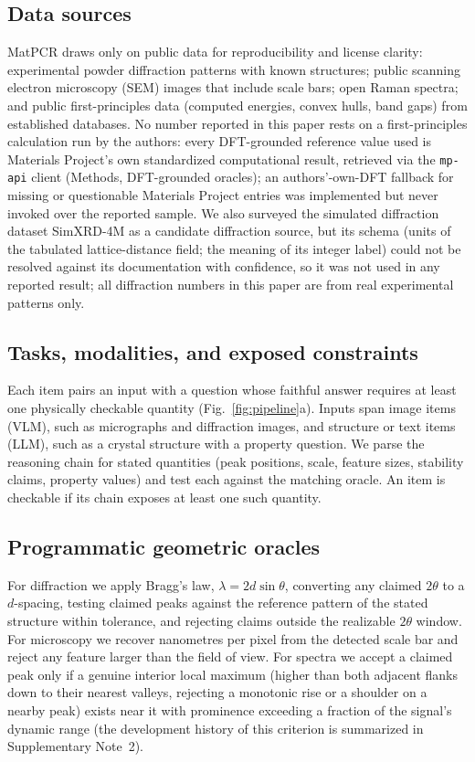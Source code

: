 \documentclass[pdflatex,sn-nature]{sn-jnl}
\newcommand{\rev}[1]{#1}
\newcommand{\rev}[1]{{\color{blue}#1}}
\begin{document}
\subsection*{Data sources}
MatPCR draws only on public data for reproducibility and license clarity: experimental
powder diffraction patterns with known structures;\cite{opxrd2025} public scanning electron microscopy (SEM) images that include scale bars;\cite{aversa2018nffa} open Raman spectra;\cite{lafuente2015rruff} and public first-principles data (computed energies, convex hulls, band gaps) from established databases.\cite{matproj2013} No number reported in this paper rests on a first-principles calculation run by the authors: every DFT-grounded reference value used is Materials Project's own standardized computational result, retrieved via the \texttt{mp-api} client (Methods, DFT-grounded oracles); an authors'-own-DFT fallback for missing or questionable Materials Project entries was implemented but never invoked over the reported sample. We also surveyed the simulated diffraction dataset SimXRD-4M\cite{simxrd2024} as a candidate diffraction source, but its schema (units of the tabulated lattice-distance field; the meaning of its integer label) could not be resolved against its documentation with confidence, so it was not used in any reported result; all diffraction numbers in this paper are from real experimental
patterns only.

\subsection*{Tasks, modalities, and exposed constraints}
Each item pairs an input with a question whose faithful answer requires at least one
physically checkable quantity (Fig.~\ref{fig:pipeline}a). Inputs span image items (VLM), such as micrographs and diffraction images, and structure or text items (LLM), such as a crystal structure with a property question. We parse the reasoning chain for stated quantities (peak positions, scale, feature sizes, stability claims, property values) and test each against the matching oracle. An item is checkable if its chain exposes at least one such quantity.

\subsection*{Programmatic geometric oracles}
For diffraction we apply Bragg's law, $\lambda = 2 d \sin\theta$, converting any
claimed $2\theta$ to a $d$-spacing, testing claimed peaks against the reference
pattern of the stated structure within tolerance, and rejecting claims outside the
realizable $2\theta$ window. For microscopy we recover nanometres per pixel from the
detected scale bar and reject any feature larger than the field of view. For spectra
we accept a claimed peak only if a genuine interior local maximum (higher than both
adjacent flanks down to their nearest valleys, rejecting a monotonic rise or a shoulder on a nearby peak) exists near it with prominence exceeding a fraction of the signal's dynamic range\rev{ (the development history of this criterion is summarized in Supplementary Note~2)}.
\end{document}
